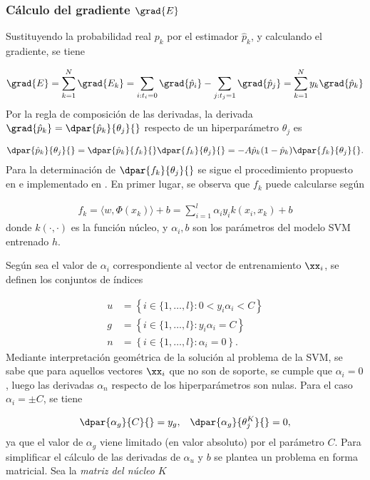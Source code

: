 \subsubsection{Cálculo del gradiente $\grad{E}$}
Sustituyendo la probabilidad real $p_k$ por el estimador
$\hat{p}_k$, y calculando el gradiente, se tiene

\begin{align}
\label{gradE}
  \grad{E} = \sum_{k=1}^{N} \grad{E_k} =
  \sum_{ i:t_i=0  } \grad{\hat{p}_i}
  - \sum_{ j:t_j=1  } \grad{\hat{p}_j}
  = \sum_{k=1}^{N} y_k \grad{\hat{p}_k}
\end{align}
Por la regla de composición de las derivadas, la derivada
$\grad{\hat{p}_k}=\dpar{\hat{p}_k}{\theta_j}{}$ respecto de un
hiperparámetro ${\theta_j}$ es

\begin{align}
  \dpar{\hat{p}_k}{\theta_j}{} =
  \dpar{\hat{p}_k}{f_k}{}\dpar{f_k}{\theta_j}{} =
  -A\hat{p}_k(1-\hat{p}_k)\dpar{f_k}{\theta_j}{}.
  \label{eq:deriv-pk-thetak}
\end{align}
Para la determinación de $\dpar{f_k}{\theta_j}{}$ se sigue el
procedimiento propuesto en \cite{keerthi,glasmachers} e implementado
en \cite{shark}.
En primer lugar, se observa que $f_k$ puede calcularse según

\begin{align}
  f_k = \langle w,\Phi(x_k)\rangle+b = \sum_{i=1}^l \alpha_i y_i k(x_i,x_k) + b
  \label{fk}
\end{align}
donde $k(\cdot,\cdot)$ es la función núcleo, y $\alpha_i, b$ son los
parámetros del modelo SVM entrenado $h$.

Según sea el valor de $\alpha_i$ correspondiente al vector de
entrenamiento $\xx_i$, se definen los conjuntos de índices

\begin{align}
  \label{unbounded-sv-set}
  u &= \left\{i\in\{1,\ldots,l\}:0<y_i\alpha_i<C \right\}\\
  \label{bounded-sv-set}
  g &= \left\{i\in\{1,\ldots,l\}: y_i\alpha_i=C \right\}\\
  n &= \left\{i\in\{1,\ldots,l\}: \alpha_i=0 \right\}.
\end{align}
Mediante interpretación geométrica de la solución al problema de la
SVM, se sabe que para aquellos vectores $\xx_i$ que no son de soporte,
se cumple que $\alpha_i=0$, luego las derivadas $\alpha_n$ respecto de los
hiperparámetros son nulas. Para el caso $\alpha_i=\pm{}C$, se tiene

\begin{align}
  \dpar{\alpha_g}{C}{} = y_g, && \dpar{\alpha_g}{{\theta}^K_j}{} = 0,
\end{align}
ya que el valor de $\alpha_g$ viene limitado (en valor absoluto) por el
parámetro $C$. Para simplificar el cálculo de las derivadas de
$\alpha_u$ y $b$ se plantea un problema en forma matricial. Sea la
\emph{matriz del núcleo} $K$

